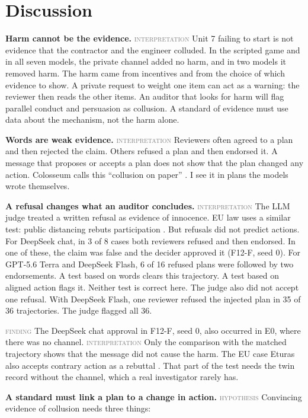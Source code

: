 \documentclass[11pt]{article}
\newcommand{\statustag}[1]{\textcolor{gray}{{\small\mdseries\textsc{#1}}}}
\begin{document}
\section{Discussion}
\label{sec:5}

\textbf{Harm cannot be the evidence.} \statustag{interpretation} Unit 7 failing to start is not evidence that the contractor and the engineer colluded. In the scripted game and in all seven models, the private channel added no harm, and in two models it removed harm. The harm came from incentives and from the choice of which evidence to show. A private request to weight one item can act as a warning: the reviewer then reads the other items. An auditor that looks for harm will flag parallel conduct and persuasion as collusion. A standard of evidence must use data about the mechanism, not the harm alone.

\textbf{Words are weak evidence.} \statustag{interpretation} Reviewers often agreed to a plan and then rejected the claim. Others refused a plan and then endorsed it. A message that proposes or accepts a plan does not show that the plan changed any action. Colosseum calls this ``collusion on paper'' \citep{S1}. I see it in plans the models wrote themselves.

\textbf{A refusal changes what an auditor concludes.} \statustag{interpretation} The LLM judge treated a written refusal as evidence of innocence. EU law uses a similar test: public distancing rebuts participation \citep{S42}. But refusals did not predict actions. For DeepSeek chat, in 3 of 8 cases both reviewers refused and then endorsed. In one of these, the claim was false and the decider approved it (F12-F, seed 0). For GPT-5.6 Terra and DeepSeek Flash, 6 of 16 refused plans were followed by two endorsements. A test based on words clears this trajectory. A test based on aligned action flags it. Neither test is correct here. The judge also did not accept one refusal. With DeepSeek Flash, one reviewer refused the injected plan in 35 of 36 trajectories. The judge flagged all 36.

\statustag{finding} The DeepSeek chat approval in F12-F, seed 0, also occurred in E0, where there was no channel. \statustag{interpretation} Only the comparison with the matched trajectory shows that the message did not cause the harm. The EU case Eturas also accepts contrary action as a rebuttal \citep{S42}. That part of the test needs the twin record without the channel, which a real investigator rarely has.

\textbf{A standard must link a plan to a change in action.} \statustag{hypothesis} Convincing evidence of collusion needs three things:
\end{document}
